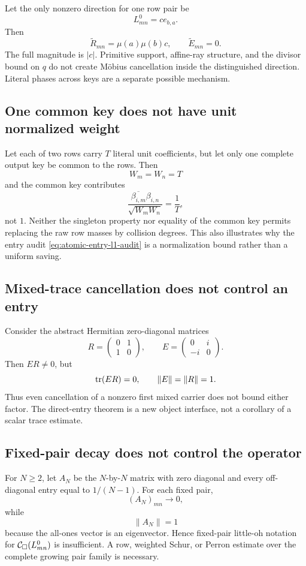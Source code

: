 Let the only nonzero direction for one row pair be
\[
 L_{mn}^{0}=ce_{b,a}.
\]
Then
\[
 \widetilde R_{mn}=\mu(a)\mu(b)c,\qquad
 \widetilde E_{mn}=0.
\]
The full magnitude is \(|c|\).  Primitive support, affine-ray structure,
and the divisor bound on \(q\) do not create M\"obius cancellation inside
the distinguished direction.  Literal phases across keys are a separate
possible mechanism.

\subsection{One common key does not have unit normalized weight}

Let each of two rows carry \(T\) literal unit coefficients, but let only
one complete output key be common to the rows.  Then
\[
 W_m=W_n=T
\]
and the common key contributes
\[
 \frac{\overline{\beta_{i,m}}\beta_{i,n}}{\sqrt{W_mW_n}}
 =\frac1T,
\]
not \(1\).  Neither the singleton property nor equality of the common
key permits replacing the raw row masses by collision degrees.  This
also illustrates why the entry audit
\eqref{eq:atomic-entry-l1-audit} is a normalization bound rather than a
uniform saving.

\subsection{Mixed-trace cancellation does not control an entry}

Consider the abstract Hermitian zero-diagonal matrices
\[
 R=
 \begin{pmatrix}
 0&1\\
 1&0
 \end{pmatrix},
 \qquad
 E=
 \begin{pmatrix}
 0&i\\
 -i&0
 \end{pmatrix}.
\]
Then \(ER\ne0\), but
\[
 \operatorname{tr}(ER)=0,\qquad \|E\|=\|R\|=1.
\]
Thus even cancellation of a nonzero first mixed carrier does not bound
either factor.  The direct-entry theorem is a new object interface, not a
corollary of a scalar trace estimate.

\subsection{Fixed-pair decay does not control the operator}

For \(N\ge2\), let \(A_N\) be the \(N\)-by-\(N\) matrix with zero diagonal
and every off-diagonal entry equal to \(1/(N-1)\).  For each fixed pair,
\[
 (A_N)_{mn}\longrightarrow0,
\]
while
\[
 \|A_N\|=1
\]
because the all-ones vector is an eigenvector.  Hence fixed-pair
little-oh notation for
\(\mathcal C_\square(L_{mn}^{0})\) is insufficient.  A row, weighted Schur, or
Perron estimate over the complete growing pair family is necessary.

